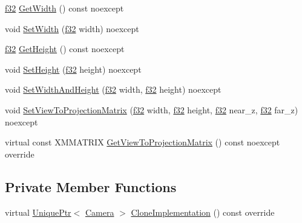\begin{DoxyCompactItemize}
\item 
\hyperlink{namespacemage_a6a44ad388483959dc4dff9f2aef91431}{f32} \hyperlink{classmage_1_1_orthographic_camera_a62a3d61d2a28b2e90a83a0739d11129d}{Get\+Width} () const noexcept
\item 
void \hyperlink{classmage_1_1_orthographic_camera_a192634a09a3ca3235fc63118e1aa30ef}{Set\+Width} (\hyperlink{namespacemage_a6a44ad388483959dc4dff9f2aef91431}{f32} width) noexcept
\item 
\hyperlink{namespacemage_a6a44ad388483959dc4dff9f2aef91431}{f32} \hyperlink{classmage_1_1_orthographic_camera_af80f9a4a2340cd474180c1b6c43788eb}{Get\+Height} () const noexcept
\item 
void \hyperlink{classmage_1_1_orthographic_camera_ac27c98097ed9d53d91729033de629f7e}{Set\+Height} (\hyperlink{namespacemage_a6a44ad388483959dc4dff9f2aef91431}{f32} height) noexcept
\item 
void \hyperlink{classmage_1_1_orthographic_camera_a2dd0dfc4ec5258a3b1bace03a71a68c9}{Set\+Width\+And\+Height} (\hyperlink{namespacemage_a6a44ad388483959dc4dff9f2aef91431}{f32} width, \hyperlink{namespacemage_a6a44ad388483959dc4dff9f2aef91431}{f32} height) noexcept
\item 
void \hyperlink{classmage_1_1_orthographic_camera_a172b31e05b7f1aebaba1c833e82fc119}{Set\+View\+To\+Projection\+Matrix} (\hyperlink{namespacemage_a6a44ad388483959dc4dff9f2aef91431}{f32} width, \hyperlink{namespacemage_a6a44ad388483959dc4dff9f2aef91431}{f32} height, \hyperlink{namespacemage_a6a44ad388483959dc4dff9f2aef91431}{f32} near\+\_\+z, \hyperlink{namespacemage_a6a44ad388483959dc4dff9f2aef91431}{f32} far\+\_\+z) noexcept
\item 
virtual const X\+M\+M\+A\+T\+R\+IX \hyperlink{classmage_1_1_orthographic_camera_a1e8ea42a5df6dab1163b2c3938480f7c}{Get\+View\+To\+Projection\+Matrix} () const noexcept override
\end{DoxyCompactItemize}
\subsection*{Private Member Functions}
\begin{DoxyCompactItemize}
\item 
virtual \hyperlink{namespacemage_a3316d7143a973e37adf1110f2e80ca31}{Unique\+Ptr}$<$ \hyperlink{classmage_1_1_camera}{Camera} $>$ \hyperlink{classmage_1_1_orthographic_camera_aeef89cff8f4272b1412fa3ce366e656d}{Clone\+Implementation} () const override
\end{DoxyCompactItemize}
